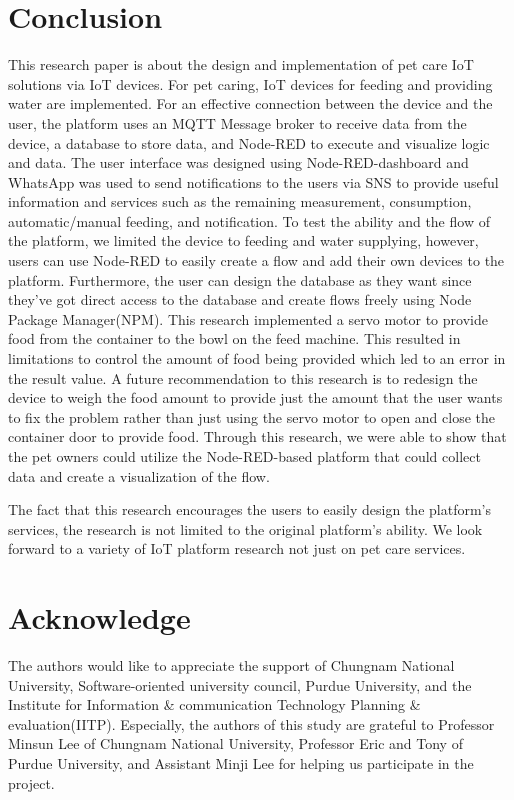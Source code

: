 \documentclass[conference]{IEEEtran}
\begin{document}
\section{Conclusion}
This research paper is about the design and implementation of pet care IoT solutions via IoT
devices. For pet caring, IoT devices for feeding and providing water are implemented. For an
effective connection between the device and the user, the platform uses an MQTT Message
broker to receive data from the device, a database to store data, and Node-RED to execute and
visualize logic and data. The user interface was designed using Node-RED-dashboard and
WhatsApp was used to send notifications to the users via SNS to provide useful information and
services such as the remaining measurement, consumption, automatic/manual feeding, and
notification. To test the ability and the flow of the platform, we limited the device to feeding and water
supplying, however, users can use Node-RED to easily create a flow and add their own devices
to the platform. Furthermore, the user can design the database as they want since they’ve got
direct access to the database and create flows freely using Node Package Manager(NPM).
This research implemented a servo motor to provide food from the container to the bowl on the
feed machine. This resulted in limitations to control the amount of food being provided which led
to an error in the result value. A future recommendation to this research is to redesign the
device to weigh the food amount to provide just the amount that the user wants to fix the
problem rather than just using the servo motor to open and close the container door to provide
food. Through this research, we were able to show that the pet owners could utilize the
Node-RED-based platform that could collect data and create a visualization of the flow. 

The fact that this research encourages the users to easily design the platform’s services, the research is
not limited to the original platform’s ability. We look forward to a variety of IoT platform research
not just on pet care services.


\section{Acknowledge}
The authors would like to appreciate the support of Chungnam National University, Software-oriented university council, Purdue University, and the Institute for Information \& communication Technology Planning \& evaluation(IITP). Especially, the authors of this study are grateful to Professor Minsun Lee of Chungnam National University, Professor Eric and Tony of Purdue University, and Assistant Minji Lee for helping us participate in the project.
\end{document}
